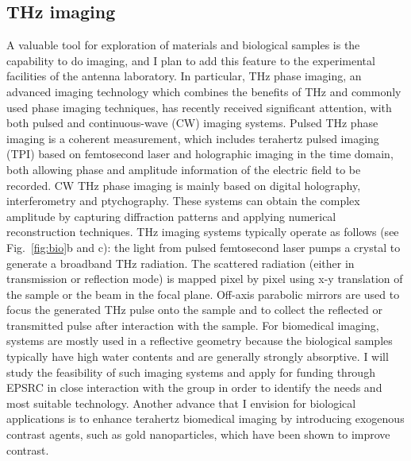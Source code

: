 \documentclass[11pt]{academia}
\begin{document}
\subsection{THz imaging}
A valuable tool for exploration of materials and biological samples is 
the capability to do imaging, and I plan to add this feature to the 
experimental facilities of the antenna laboratory. 
In particular, THz phase
imaging, an advanced imaging technology which combines the benefits of THz and commonly used phase
imaging techniques, has recently received significant attention, with both pulsed 
and continuous-wave (CW) imaging systems\autocite{wanTerahertzPhaseImaging2020}. Pulsed THz phase imaging is a coherent measurement, 
which includes terahertz pulsed imaging (TPI) based on femtosecond
laser and holographic imaging in the time domain, both allowing phase and amplitude 
information of the electric
field to be recorded. CW THz phase imaging is mainly based on digital holography, 
interferometry and ptychography. These systems can obtain the complex amplitude 
by capturing diffraction patterns and applying numerical reconstruction techniques. 
THz imaging systems typically operate as follows (see Fig.~\ref{fig:bio}b and c): the light from pulsed
femtosecond laser pumps a crystal to generate a broadband THz radiation. 
The scattered radiation (either in transmission or reflection mode) 
is mapped pixel by pixel using x-y
translation of the sample or the beam in the focal plane. 
Off-axis parabolic mirrors are used to focus the
generated THz pulse onto the sample and to collect the reflected or
transmitted pulse after interaction with the sample. 
For biomedical imaging, systems are mostly used in a reflective geometry
 because the biological samples typically have high water contents
 and are generally strongly absorptive. 
 I will study the feasibility of such imaging systems and apply for funding through EPSRC in close 
 interaction with the group in order to identify the needs and most suitable technology.
Another advance that I envision for biological applications is to enhance terahertz biomedical
imaging by introducing exogenous contrast agents, such as gold nanoparticles, 
which have been shown to improve contrast.
\end{document}
